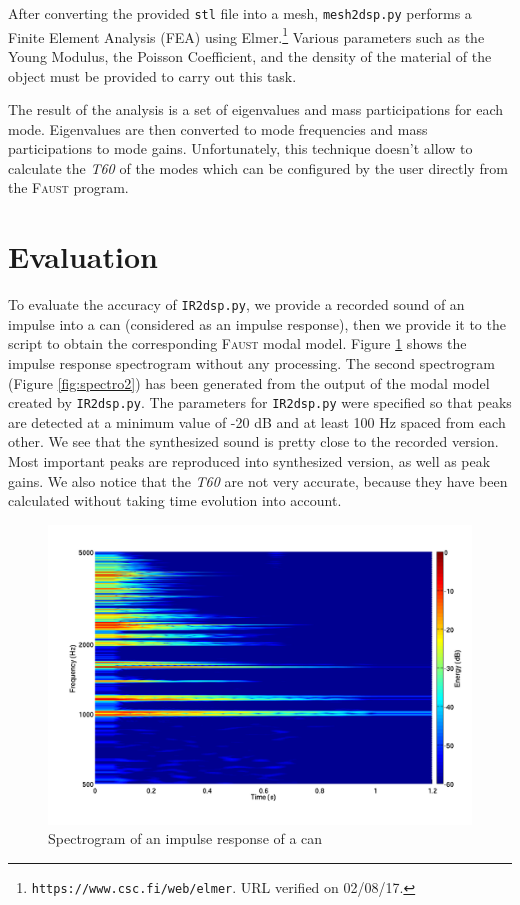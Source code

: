 \documentclass[11pt,a4paper]{article}
\newcommand{\f}{\textsc{Faust}}
\begin{document}
After converting the provided \texttt{stl} file into a mesh, \texttt{mesh2dsp.py} performs a Finite Element Analysis (FEA) using Elmer.\footnote{\texttt{https://www.csc.fi/web/elmer}. URL verified on 02/08/17.} Various parameters such as the Young Modulus, the Poisson Coefficient, and the density of the material of the object must be provided to carry out this task.

The result of the analysis is a set of eigenvalues and mass participations for each mode. Eigenvalues are then converted to mode frequencies and mass participations to mode gains. Unfortunately, this technique doesn't allow to calculate the \textit{T60} of the modes which can be configured by the user directly from the \f{} program. 

\section{Evaluation}


To evaluate the accuracy of \texttt{IR2dsp.py}, we provide a recorded sound of an impulse into a can (considered as an impulse response), then we provide it to the script to obtain the corresponding \f{} modal model. Figure \ref{fig:spectro1} shows the impulse response spectrogram without any processing. The second spectrogram (Figure \ref{fig:spectro2}) has been generated from the output of the modal model created by \texttt{IR2dsp.py}. The parameters for \texttt{IR2dsp.py} were specified so that peaks are detected at a minimum value of -20 dB and at least 100 Hz spaced from each other. We see that the synthesized sound is pretty close to the recorded version. Most important peaks are reproduced into synthesized version, as well as peak gains. We also notice that the \textit{T60} are not very accurate, because they have been calculated without taking time evolution into account.

\begin{figure}[htbp]
	\centering 
	\includegraphics[width=\columnwidth]{pictures/canIR.pdf}
	\caption{Spectrogram of an impulse response of a can}
	\label{fig:spectro1}
\end{figure}
\end{document}
